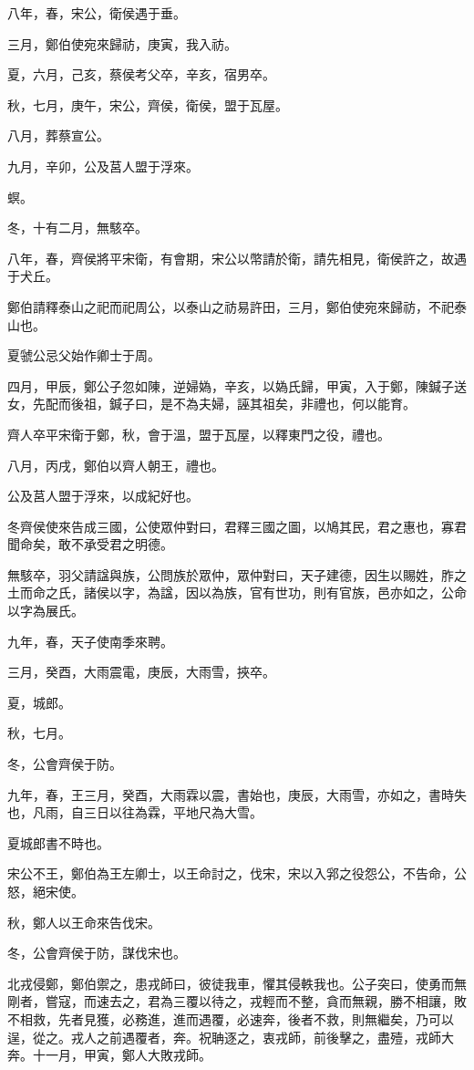 \begin{pinyinscope}
八年，春，宋公，衛侯遇于垂。

三月，鄭伯使宛來歸祊，庚寅，我入祊。

夏，六月，己亥，蔡侯考父卒，辛亥，宿男卒。

秋，七月，庚午，宋公，齊侯，衛侯，盟于瓦屋。

八月，葬蔡宣公。

九月，辛卯，公及莒人盟于浮來。

螟。

冬，十有二月，無駭卒。

八年，春，齊侯將平宋衛，有會期，宋公以幣請於衛，請先相見，衛侯許之，故遇于犬丘。

鄭伯請釋泰山之祀而祀周公，以泰山之祊易許田，三月，鄭伯使宛來歸祊，不祀泰山也。

夏虢公忌父始作卿士于周。

四月，甲辰，鄭公子忽如陳，逆婦媯，辛亥，以媯氏歸，甲寅，入于鄭，陳鍼子送女，先配而後祖，鍼子曰，是不為夫婦，誣其祖矣，非禮也，何以能育。

齊人卒平宋衛于鄭，秋，會于溫，盟于瓦屋，以釋東門之役，禮也。

八月，丙戌，鄭伯以齊人朝王，禮也。

公及莒人盟于浮來，以成紀好也。

冬齊侯使來告成三國，公使眾仲對曰，君釋三國之圖，以鳩其民，君之惠也，寡君聞命矣，敢不承受君之明德。

無駭卒，羽父請諡與族，公問族於眾仲，眾仲對曰，天子建德，因生以賜姓，胙之土而命之氏，諸侯以字，為諡，因以為族，官有世功，則有官族，邑亦如之，公命以字為展氏。

九年，春，天子使南季來聘。

三月，癸酉，大雨震電，庚辰，大雨雪，挾卒。

夏，城郎。

秋，七月。

冬，公會齊侯于防。

九年，春，王三月，癸酉，大雨霖以震，書始也，庚辰，大雨雪，亦如之，書時失也，凡雨，自三日以往為霖，平地尺為大雪。

夏城郎書不時也。

宋公不王，鄭伯為王左卿士，以王命討之，伐宋，宋以入郛之役怨公，不告命，公怒，絕宋使。

秋，鄭人以王命來告伐宋。

冬，公會齊侯于防，謀伐宋也。

北戎侵鄭，鄭伯禦之，患戎師曰，彼徒我車，懼其侵軼我也。公子突曰，使勇而無剛者，嘗寇，而速去之，君為三覆以待之，戎輕而不整，貪而無親，勝不相讓，敗不相救，先者見獲，必務進，進而遇覆，必速奔，後者不救，則無繼矣，乃可以逞，從之。戎人之前遇覆者，奔。祝聃逐之，衷戎師，前後擊之，盡殪，戎師大奔。十一月，甲寅，鄭人大敗戎師。


\end{pinyinscope}
